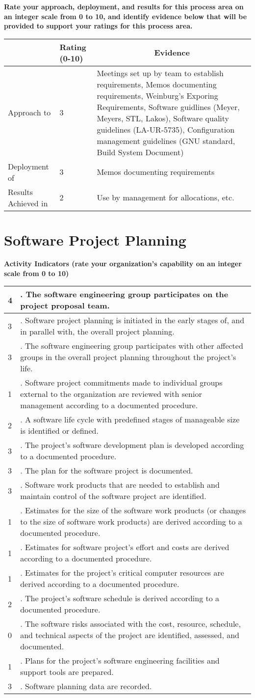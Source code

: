 \documentclass{article}
\newcommand{\KPAname}{}
\let\KPAsection=\section
\renewcommand{\section}[1]{\renewcommand{\KPAname}{#1}\KPAsection{#1}}
\newcounter{activity}		%
\newenvironment{KPAActivity}
{
    \setcounter{activity}{0} %
    {\bf Activity Indicators (rate your organization's capability
    on an integer scale from 0 to 10)} %
    \begin{center}
    \begin{tabular}{|p{0.5in}|p{6.0in}|} \hline %
}
{
    \end{tabular}
    \end{center}
}
\newcommand{\Activity}[2]
{
    \stepcounter{activity} #1 & \arabic{activity}. #2 \\ \hline
} %
\newenvironment{KPARate}
{
    {\bf Rate your approach, deployment, and results for
    this process area on an integer scale from 0 to 10, and 
    identify evidence below that will be provided to support your
    ratings for this process area.}
    \begin{center}
    \begin{tabular}{|p{1.0in}|p{0.5in}|p{5.0in}|} \hline
    & Rating (0-10) & \multicolumn{1}{c|}{Evidence} \\ \hline
}
{
    \end{tabular}
    \end{center}
}
\newcommand{\Approach}[2]{Approach to \KPAname & #1 & #2 \\ \hline}
\newcommand{\Deployment}[2]{Deployment of \KPAname & #1 & #2 \\ \hline}
\newcommand{\Results}[2]{Results Achieved in \KPAname & #1 & #2 \\
	\hline}
\begin{document}
\begin{KPARate}
\Approach{3}{Meetings set up by team to establish requirements, Memos
documenting requirements, Weinburg's Exporing Requirements, Software
guidlines (Meyer, Meyers, STL, Lakos), Software quality guidelines
(LA-UR-5735), Configuration management guidelines (GNU standard, Build
System Document)}
\Deployment{3}{Memos documenting requirements}
\Results{2}{Use by management for allocations, etc.}
\end{KPARate}

\newpage
\section{Software Project Planning}

\begin{KPAActivity}
\Activity{4}{The software engineering group participates on the
project proposal team.}
\Activity{3}{Software project planning is initiated in the early
stages of, and in parallel with, the overall project planning.}
\Activity{3}{The software engineering group participates with other
affected groups in the overall project planning throughout the
project's life.}
\Activity{1}{Software project commitments made to individual groups
external to the organization are reviewed with senior management
according to a documented procedure.}
\Activity{2}{A software life cycle with predefined stages of
manageable size is identified or defined.}
\Activity{3}{The project's software development plan is developed
according to a documented procedure.}
\Activity{3}{The plan for the software project is documented.}
\Activity{3}{Software work products that are needed to establish
and maintain control of the software project are identified.}
\Activity{1}{Estimates for the size of the software work products (or
changes to the size of software work products) are derived according
to a documented procedure.}
\Activity{1}{Estimates for software project's effort and costs are
derived according to a documented procedure.}
\Activity{1}{Estimates for the project's critical computer
resources are derived according to a documented procedure.}
\Activity{2}{The project's software schedule is derived according
to a documented procedure.}
\Activity{0}{The software risks associated with the cost,
resource, schedule, and technical aspects of the project are
identified, assessed, and documented.}
\Activity{1}{Plans for the project's software engineering
facilities and support tools are prepared.}
\Activity{3}{Software planning data are recorded.}
\end{KPAActivity}
\end{document}
